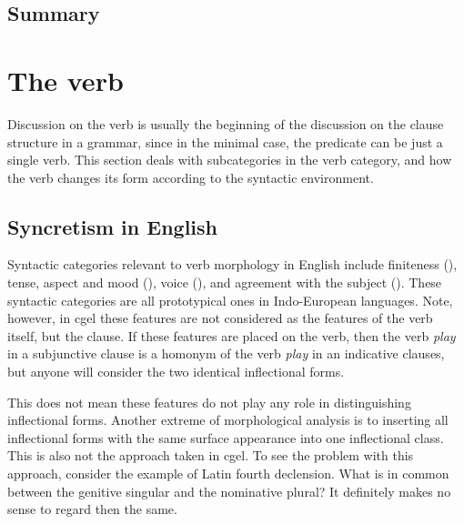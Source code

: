 \documentclass{article}
\newcommand*{\corpus}[1]{\emph{#1}}
\begin{document}
\subsection{Summary}



\section{The verb}

Discussion on the verb is usually the beginning of the discussion on the clause structure in a grammar,
since in the minimal case, 
the predicate can be just a single verb.
This section deals with subcategories in the verb category,
and how the verb changes its form according to the syntactic environment.

\subsection{Syncretism in English}

Syntactic categories relevant to verb morphology in English include 
finiteness (),
tense, aspect and mood (),
voice (),
and agreement with the subject ().
These syntactic categories are all prototypical ones in Indo-European languages.
Note, however, in \ac{cgel} these features are not considered as the features of the verb itself,
but the clause. 
If these features are placed on the verb, 
then the verb \corpus{play} in a subjunctive clause is a homonym of 
the verb \corpus{play} in an indicative clauses,
but anyone will consider the two identical inflectional forms.

This does not mean these features do not play any role in distinguishing inflectional forms.
Another extreme of morphological analysis is to 
inserting all inflectional forms with the same surface appearance into one inflectional class.
This is also not the approach taken in \ac{cgel}.
To see the problem with this approach, consider the example of Latin fourth declension.
What is in common between the genitive singular and the nominative plural?
It definitely makes no sense to regard then the same.
\end{document}
